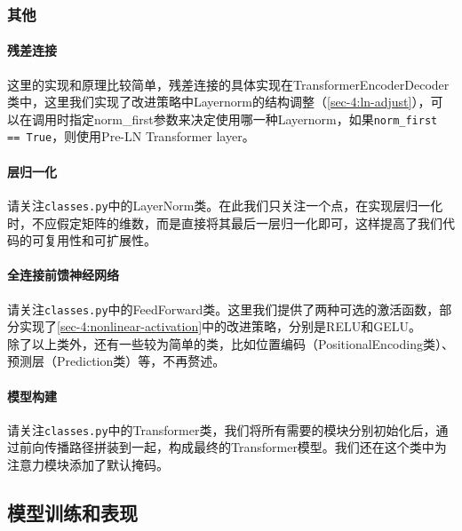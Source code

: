 \subsubsection{其他}

\paragraph{残差连接}

这里的实现和原理比较简单，残差连接的具体实现在TransformerEncoderDecoder类中，这里我们实现了改进策略中Layernorm的结构调整（\ref{sec-4:ln-adjust}），可以在调用时指定norm\_first参数来决定使用哪一种Layernorm，如果\texttt{norm\_first == True}，则使用Pre-LN Transformer layer。

\paragraph{层归一化} 请关注\texttt{classes.py}中的LayerNorm类。在此我们只关注一个点，在实现层归一化时，不应假定矩阵的维数，而是直接将其最后一层归一化即可，这样提高了我们代码的可复用性和可扩展性。

\paragraph{全连接前馈神经网络} 请关注\texttt{classes.py}中的FeedForward类。这里我们提供了两种可选的激活函数，部分实现了\ref{sec-4:nonlinear-activation}中的改进策略，分别是RELU和GELU。
\\

除了以上类外，还有一些较为简单的类，比如位置编码（PositionalEncoding类）、预测层（Prediction类）等，不再赘述。

\paragraph{模型构建} 请关注\texttt{classes.py}中的Transformer类，我们将所有需要的模块分别初始化后，通过前向传播路径拼装到一起，构成最终的Transformer模型。我们还在这个类中为注意力模块添加了默认掩码。

\subsection{模型训练和表现}


